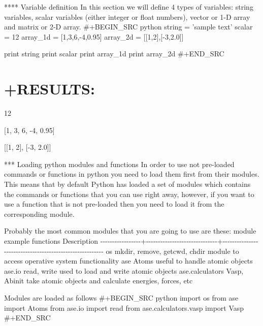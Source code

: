 \documentclass[11pt]{article}
\providecommand{\tightlist}{%
      \setlength{\itemsep}{0pt}\setlength{\parskip}{0pt}}
\begin{document}
**** Variable definition In this section we will define 4 types of
variables: string variables, scalar variables (either integer or float
numbers), vector or 1-D array and matrix or 2-D array. \#+BEGIN\_SRC
python string = 'sample text' scalar = 12 array\_1d =
{[}1,3,6,-4,0.95{]} array\_2d = {[}{[}1,2{]},{[}-3,2.0{]}{]}

print string print scalar print array\_1d print array\_2d \#+END\_SRC

\section{+RESULTS:}\label{results-8}

\begin{description}
\tightlist
\item[: sample text]
12

{[}1, 3, 6, -4, 0.95{]}

{[}{[}1, 2{]}, {[}-3, 2.0{]}{]}
\end{description}

*** Loading python modules and functions In order to use not pre-loaded
commands or functions in python you need to load them first from their
modules. This means that by default Python has loaded a set of modules
which contains the commands or functions that you can use right away,
however, if you want to use a function that is not pre-loaded then you
need to load it from the corresponding module.

Probably the most common modules that you are going to use are these:
\textbar{} module \textbar{} example functions \textbar{} Description
\textbar{}
\textbar{}-\/-\/-\/-\/-\/-\/-\/-\/-\/-\/-\/-\/-\/-\/-\/-\/-+-\/-\/-\/-\/-\/-\/-\/-\/-\/-\/-\/-\/-\/-\/-\/-\/-\/-\/-\/-\/-\/-\/-\/-\/-\/-\/-\/-\/-\/-+-\/-\/-\/-\/-\/-\/-\/-\/-\/-\/-\/-\/-\/-\/-\/-\/-\/-\/-\/-\/-\/-\/-\/-\/-\/-\/-\/-\/-\/-\/-\/-\/-\/-\/-\/-\/-\/-\/-\/-\/-\/-\/-\/-\/-\/-\/-\/-\/-\/-\/-\/-\/-\/-\/-\/-\/-\textbar{}
\textbar{} os \textbar{} mkdir, remove, getcwd, chdir \textbar{} module
to access operative system functionality \textbar{} \textbar{} ase
\textbar{} Atoms \textbar{} useful to handle atomic objects \textbar{}
\textbar{} ase.io \textbar{} read, write \textbar{} used to load and
write atomic objects \textbar{} \textbar{} ase.calculators \textbar{}
Vasp, Abinit \textbar{} take atomic objects and calculate energies,
forces, etc \textbar{} \textbar{} \textbar{} \textbar{} \textbar{}

Modules are loaded as follows \#+BEGIN\_SRC python import os from ase
import Atoms from ase.io import read from ase.calculators.vasp import
Vasp \#+END\_SRC
\end{document}
